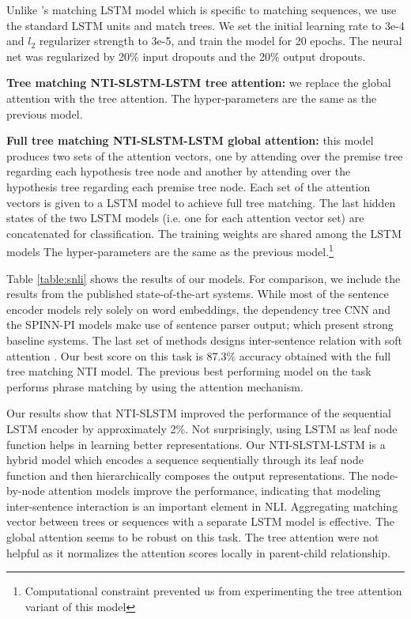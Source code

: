 \documentclass[11pt]{article}
\begin{document}
Unlike 's matching LSTM model which is specific to matching sequences, 
we use the standard LSTM units and match trees.
We set the initial learning rate to 3e-4 and $l_2$ regularizer strength to 3e-5, and train the model for 20 epochs. The neural net was regularized by 20\% input dropouts and the 20\% output dropouts.

\textbf{Tree matching NTI-SLSTM-LSTM tree attention:} we replace the global attention with the tree attention. The hyper-parameters are the same as the previous model.

\textbf{Full tree matching NTI-SLSTM-LSTM global attention:} this model produces two sets of the attention vectors, one by attending over the premise tree regarding each hypothesis tree node and another by attending over the hypothesis tree regarding each premise tree node. Each set of the attention vectors is given to a LSTM model to achieve full tree matching. The last hidden states of the two LSTM models (i.e. one for each attention vector set) are concatenated for classification. The training weights are shared among the LSTM models The hyper-parameters are the same as the previous model.\footnote{Computational constraint prevented us from experimenting the tree attention variant of this model}

Table \ref{table:snli} shows the results of our models. For comparison, we include the results from the published state-of-the-art systems.
While most of the sentence encoder models rely solely on word embeddings, the dependency tree CNN and the SPINN-PI models make use of sentence parser output; which present strong baseline systems. The last set of methods designs inter-sentence relation with soft attention \cite{bahdanau:15}. Our best score on this task is 87.3\% accuracy obtained with the full tree matching NTI model. The previous best performing model on the task performs phrase matching by using the attention mechanism. 

Our results show that NTI-SLSTM improved the performance of the sequential LSTM encoder by approximately 2\%. Not surprisingly, using LSTM as leaf node function helps in learning better representations. Our NTI-SLSTM-LSTM is a hybrid model which encodes a sequence sequentially through its leaf node function and then hierarchically composes the output representations. The node-by-node attention models improve the performance, indicating that modeling inter-sentence interaction is an important element in NLI. Aggregating matching vector between trees or sequences with a separate LSTM model is effective. The global attention seems to be robust on this task. The tree attention were not helpful as it normalizes the attention scores locally in parent-child relationship.
\end{document}
